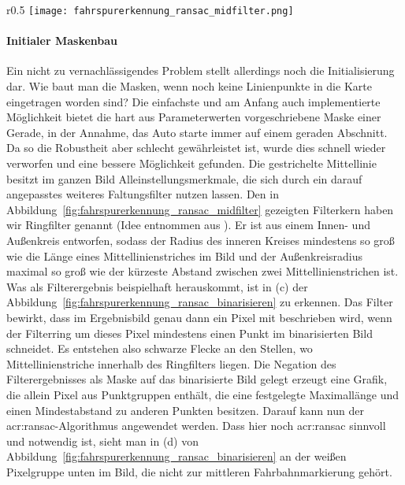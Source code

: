 \begin{wrapfigure}{r}{0.5\textwidth}
 \centering
  \texttt{[image: fahrspurerkennung\_ransac\_midfilter.png]}
  \caption{Der Kern des \\ \glqq Ringfilters\grqq}
\label{fig:fahrspurerkennung_ransac_midfilter}
\end{wrapfigure} 

\paragraph{Initialer Maskenbau} 

Ein nicht zu vernachlässigendes Problem stellt allerdings noch die Initialisierung dar. Wie baut man die Masken, wenn noch keine Linienpunkte in die Karte eingetragen worden sind? Die einfachste und am Anfang auch implementierte Möglichkeit bietet die hart aus Parameterwerten vorgeschriebene Maske einer Gerade, in der Annahme, das Auto starte immer auf einem geraden Abschnitt. Da so die Robustheit aber schlecht gewährleistet ist, wurde dies schnell wieder verworfen und eine bessere Möglichkeit gefunden. Die gestrichelte Mittellinie besitzt im ganzen Bild Alleinstellungsmerkmale, die sich durch ein darauf angepasstes weiteres Faltungsfilter nutzen lassen. Den in Abbildung~\ref{fig:fahrspurerkennung_ransac_midfilter} gezeigten Filterkern haben wir \glqq Ringfilter\grqq{} genannt (Idee entnommen aus \autocite{drauschkeEchtzeitfaehigeStartpunktalgorithmenFuer2016}). Er ist aus einem Innen- und Außenkreis entworfen, sodass der Radius des inneren Kreises mindestens so groß wie die Länge eines Mittellinienstriches im Bild und der Außenkreisradius maximal so groß wie der kürzeste Abstand zwischen zwei Mittellinienstrichen ist. Was als Filterergebnis beispielhaft herauskommt, ist in (c) der Abbildung~\ref{fig:fahrspurerkennung_ransac_binarisieren} zu erkennen. Das Filter bewirkt, dass im Ergebnisbild genau dann ein Pixel mit \grqq{} beschrieben wird, wenn der Filterring um dieses Pixel mindestens einen Punkt im binarisierten Bild schneidet. Es entstehen also \glqq schwarze Flecke\grqq{} an den Stellen, wo Mittellinienstriche innerhalb des \glqq Ringfilters\grqq{} liegen. Die Negation des Filterergebnisses als Maske auf das binarisierte Bild gelegt erzeugt eine Grafik, die allein Pixel aus Punktgruppen enthält, die eine festgelegte Maximallänge und einen Mindestabstand zu anderen Punkten besitzen. Darauf kann nun der \gls{acr:ransac}-Algorithmus angewendet werden. Dass hier noch \gls{acr:ransac} sinnvoll und notwendig ist, sieht man in (d) von Abbildung~\ref{fig:fahrspurerkennung_ransac_binarisieren} an der weißen Pixelgruppe unten im Bild, die nicht zur mittleren Fahrbahnmarkierung gehört.


